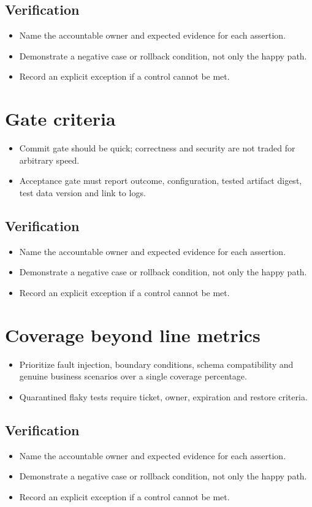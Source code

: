 \documentclass[10pt,letterpaper]{article}
\begin{document}
\subsection{Verification}
\begin{itemize}
\item Name the accountable owner and expected evidence for each assertion.
\item Demonstrate a negative case or rollback condition, not only the happy path.
\item Record an explicit exception if a control cannot be met.
\end{itemize}


\section{Gate criteria}
\begin{itemize}
\item Commit gate should be quick; correctness and security are not traded for arbitrary speed.
\item Acceptance gate must report outcome, configuration, tested artifact digest, test data version and link to logs.
\end{itemize}
\subsection{Verification}
\begin{itemize}
\item Name the accountable owner and expected evidence for each assertion.
\item Demonstrate a negative case or rollback condition, not only the happy path.
\item Record an explicit exception if a control cannot be met.
\end{itemize}


\section{Coverage beyond line metrics}
\begin{itemize}
\item Prioritize fault injection, boundary conditions, schema compatibility and genuine business scenarios over a single coverage percentage.
\item Quarantined flaky tests require ticket, owner, expiration and restore criteria.
\end{itemize}
\subsection{Verification}
\begin{itemize}
\item Name the accountable owner and expected evidence for each assertion.
\item Demonstrate a negative case or rollback condition, not only the happy path.
\item Record an explicit exception if a control cannot be met.
\end{itemize}
\end{document}
